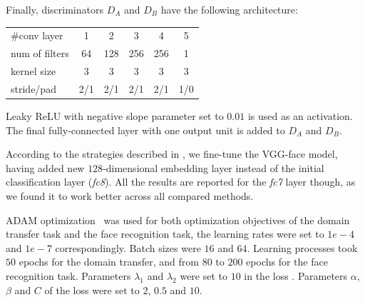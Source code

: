 Finally, discriminators $D_A$ and $D_B$ have the following architecture: 
\begin{center}
\begin{scriptsize}
\begin{tabular}{l |c c c c c }
\hline
  \#conv layer      &1      &2    &3     &4    &5  \\
  num of filters    &64     &128  &256   &256  &1  \\
  kernel size       &3      &3    &3     & 3   &3  \\
  stride/pad        &2/1    &2/1  &2/1   &2/1  &1/0\\
\hline
\end{tabular}
\end{scriptsize}
\end{center}
\vspace{0.5em}
Leaky ReLU \cite{HeZRS15} with negative slope parameter set to $0.01$ is used as an activation. The final fully-connected layer with one output unit is added to $D_A$ and $D_B$.




According to the strategies described in , we fine-tune the VGG-face model, having added new $128$-dimensional embedding layer instead of the initial classification layer (\textit{fc8}). All the results are reported for the \textit{fc7} layer though, as we found it to work better across all compared methods.

ADAM optimization~\cite{Kingma14} was used for both optimization objectives of the domain transfer task and the face recognition task, the learning rates were set to $1e-4$ and $1e-7$ correspondingly. Batch sizes were $16$ and $64$. Learning processes took $50$ epochs for the domain transfer,  and from $80$ to $200$ epochs for the face recognition task. Parameters $\lambda_1$ and $\lambda_2$ were set to $10$ in the loss . Parameters $\alpha$, $\beta$ and $C$ of the loss  were set to $2$, $0.5$ and $10$.

